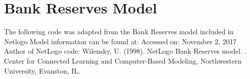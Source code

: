 \documentclass[letterpaper,10pt,english]{sphinxmanual}
\begin{document}
\label{\detokenize{index:module-examples.bank_reserves.bank_reserves.model}}

\chapter{Bank Reserves Model}
\label{\detokenize{index:bank-reserves-model}}
The following code was adapted from the Bank Reserves model included in Netlogo
Model information can be found at: 
Accessed on: November 2, 2017
Author of NetLogo code:
Wilensky, U. (1998). NetLogo Bank Reserves model.
.
Center for Connected Learning and Computer-Based Modeling,
Northwestern University, Evanston, IL.
\end{document}
